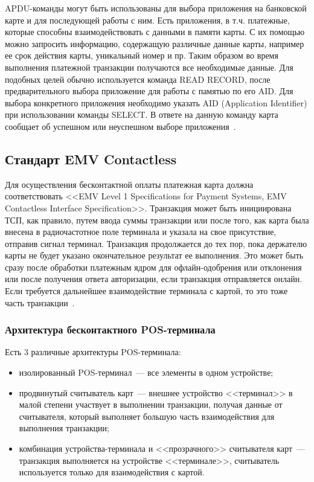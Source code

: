APDU-команды могут быть использованы для выбора приложения на банковской карте и для последующей работы с ним.
Есть приложения, в т.ч. платежные, которые способны взаимодействовать с данными в памяти карты.
С их помощью можно запросить информацию, содержащую различные данные карты, например ее срок действия карты, уникальный номер и пр.
Таким образом во время выполнения платежной транзакции получаются все необходимые данные.
Для подобных целей обычно используется команда READ RECORD, после предварительного выбора приложение для работы с памятью по его AID.
Для выбора конкретного приложения необходимо указать AID (Application Identifier) при использовании команды SELECT.
В ответе на данную команду карта сообщает об успешном или неуспешном выборе приложения~\cite{medium_apdu2_1}.



\subsection{Стандарт EMV Contactless}


Для осуществления бесконтактной оплаты платежная карта должна соответствовать <<EMV Level 1 Specifications for Payment Systems, EMV Contactless Interface Specification>>.
Транзакция может быть инициирована ТСП, как правило, путем ввода суммы транзакции или после того, как карта была внесена в радиочастотное поле терминала и указала на свое присутствие, отправив сигнал терминал.
Транзакция продолжается до тех пор, пока держателю карты не будет указано окончательное результат ее выполнения.
Это может быть сразу после обработки платежным ядром для офлайн-одобрения или отклонения или после получения ответа авторизации, если транзакция отправляется онлайн.
Если требуется дальнейшее взаимодействие терминала с картой, то это тоже часть транзакции~\cite{emv_book_A}.


\subsubsection{Архитектура бесконтактного POS-терминала}

Есть 3 различные архитектуры POS-терминала:
\begin{itemize}
    \item изолированный POS-терминал~--- все элементы в одном устройстве;
    \item продвинутый считыватель карт~--- внешнее устройство <<терминал>> в малой степени участвует в выполнении транзакции, получая данные от считывателя, который выполняет большую часть взаимодействия для выполнения транзакции;
    \item комбинация устройства-терминала и <<прозрачного>> считывателя карт~--- транзакция выполняется на устройстве <<терминале>>, считыватель используется только для взаимодействия с картой.
\end{itemize}

